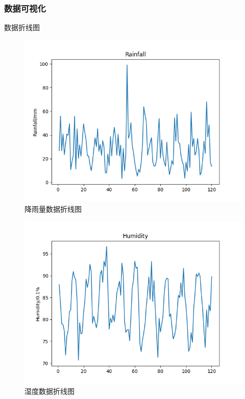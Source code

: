 \documentclass[10pt]{beamer}
\begin{document}
\begin{frame}
	\frametitle{数据可视化}
	\begin{block}{数据折线图}
		\begin{figure}[h!]
			\centering
			\includegraphics[scale=0.21]{../src/prepare_data/rr.png}
			\caption{降雨量数据折线图}
		\end{figure}

		\begin{figure}[h!]
			\centering
			\includegraphics[scale=0.21]{../src/prepare_data/hu.png}
			\caption{湿度数据折线图}
		\end{figure}
	\end{block}

\end{frame}
\end{document}
